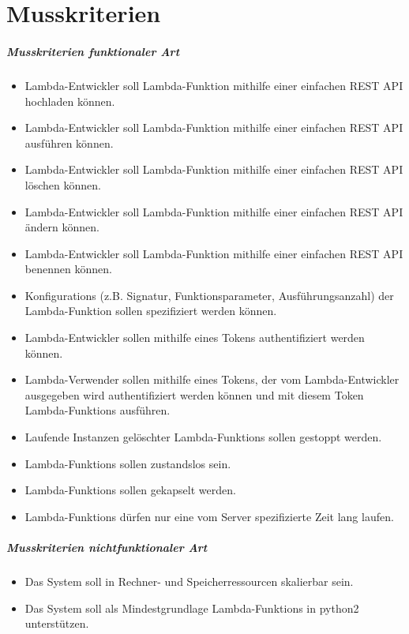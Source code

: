 \documentclass[a4paper,20pt,oneside]{book}
\begin{document}
\section{Musskriterien}
\subparagraph{Musskriterien funktionaler Art}
\begin{itemize}
\item \Gls{Lambda-Entwickler} soll \Gls{Lambda-Funktion} mithilfe einer einfachen \Gls{REST} \Gls{API} hochladen können.
\item \Gls{Lambda-Entwickler} soll \Gls{Lambda-Funktion} mithilfe einer einfachen \Gls{REST} \Gls{API} ausführen können.
\item \Gls{Lambda-Entwickler} soll \Gls{Lambda-Funktion} mithilfe einer einfachen \Gls{REST} \Gls{API} löschen können.
\item \Gls{Lambda-Entwickler} soll \Gls{Lambda-Funktion} mithilfe einer einfachen \Gls{REST} \Gls{API} ändern können.
\item \Gls{Lambda-Entwickler} soll \Gls{Lambda-Funktion} mithilfe einer einfachen \Gls{REST} \Gls{API} benennen können.
\item \Glspl{Konfiguration} (z.B. Signatur, Funktionsparameter, Ausführungsanzahl) der \gls{Lambda-Funktion} sollen spezifiziert werden können.
\item \Gls{Lambda-Entwickler} sollen mithilfe eines \Glspl{Token} authentifiziert werden können.
\item \Gls{Lambda-Verwender} sollen mithilfe eines \Glspl{Token}, der vom \Gls{Lambda-Entwickler} ausgegeben wird authentifiziert werden können und mit diesem \gls{Token} \Glspl{Lambda-Funktion} ausführen.
\item Laufende Instanzen gelöschter \Glspl{Lambda-Funktion} sollen gestoppt werden.
\item \Glspl{Lambda-Funktion} sollen \Gls{zustandslos} sein.
\item \Glspl{Lambda-Funktion} sollen \Gls{gekapselt} werden.
\item \Glspl{Lambda-Funktion} dürfen nur eine vom \Gls{Server} spezifizierte Zeit lang laufen.
\end{itemize}
\subparagraph{Musskriterien nichtfunktionaler Art}
\begin{itemize}
\item Das System soll in Rechner- und Speicherressourcen  \gls{skalierbar} sein.
\item Das System soll als Mindestgrundlage \glspl{Lambda-Funktion} in python2 unterstützen.
\end{itemize}
\pagebreak
\end{document}
